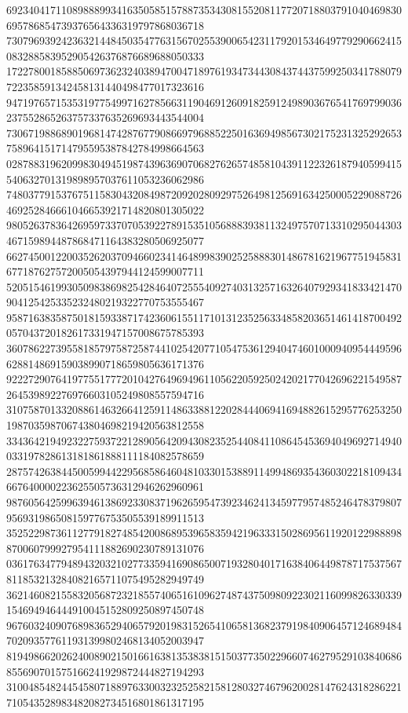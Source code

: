 \begin{DoxyCode}
      692340417110898889934163505851578873534308155208117720718803791040469830695786854739376564336319797868036718
      730796939242363214484503547763156702553900654231179201534649779290662415083288583952905426376876689688050333
      172278001858850697362324038947004718976193473443084374437599250341788079722358591342458131440498477017323616
      947197657153531977549971627856631190469126091825912498903676541769799036237552865263757337635269693443544004
      730671988689019681474287677908669796885225016369498567302175231325292653758964151714795595387842784998664563
      028788319620998304945198743963690706827626574858104391122326187940599415540632701319898957037611053236062986
      748037791537675115830432084987209202809297526498125691634250005229088726469252846661046653921714820801305022
      980526378364269597337070539227891535105688839381132497570713310295044303467159894487868471164383280506925077
      662745001220035262037094660234146489983902525888301486781621967751945831677187627572005054397944124599007711
      520515461993050983869825428464072555409274031325716326407929341833421470904125425335232480219322770753555467
      958716383587501815933871742360615511710131235256334858203651461418700492057043720182617331947157008675785393
      360786227395581857975872587441025420771054753612940474601000940954449596628814869159038990718659805636171376
      922272907641977551777201042764969496110562205925024202177042696221549587264539892276976603105249808557594716
      310758701332088614632664125911486338812202844406941694882615295776253250198703598706743804698219420563812558
      334364219492322759372212890564209430823525440841108645453694049692714940033197828613181861888111184082578659
      287574263844500599442295685864604810330153889114994869354360302218109434667640000223625505736312946262960961
      987605642599639461386923308371962659547392346241345977957485246478379807956931986508159776753505539189911513
      352522987361127791827485420086895396583594219633315028695611920122988898870060799927954111882690230789131076
      036176347794894320321027733594169086500719328040171638406449878717537567811853213284082165711075495282949749
      362146082155832056872321855740651610962748743750980922302116099826330339154694946444910045152809250897450748
      967603240907689836529406579201983152654106581368237919840906457124689484702093577611931399802468134052003947
      819498662026240089021501661638135383815150377350229660746279529103840686855690701575166241929872444827194293
      310048548244545807188976330032325258215812803274679620028147624318286221710543528983482082734516801861317195

\end{DoxyCode}
